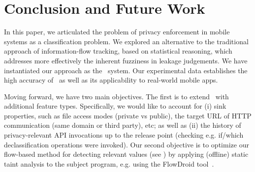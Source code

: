 \section{Conclusion and Future Work}\label{Se:conclusion}

In this paper, we articulated the problem of privacy enforcement in mobile systems as a classification problem. 
We explored an alternative to the traditional approach of information-flow tracking, based on statistical reasoning, which addresses more effectively the inherent fuzziness in leakage judgements. We have instantiated our approach as the \Tool\ system. Our experimental data establishes the high accuracy of \Tool\ as well as its applicability to real-world mobile apps.

Moving forward, we have two main objectives. The first is to extend \Tool\ with additional feature types. Specifically, we would like to account for (i) sink properties, such as file access modes (private vs public), the target URL of HTTP communication (same domain or third party), etc; as well as (ii) the history of privacy-relevant API invocations up to the release point (checking e.g. if/which declassification operations were invoked). Our second objective is to optimize our flow-based method for detecting relevant values (see ) by applying (offline) static taint analysis to the subject program, e.g. using the FlowDroid tool~\cite{FARBBKTOM:PLDI14}.  